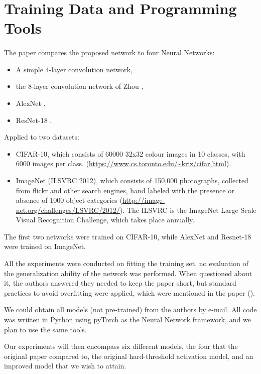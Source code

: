 \section{Training Data and Programming Tools}
\paragraph{}
The paper compares the proposed network to four Neural Networks:

\begin{itemize}
\item A simple 4-layer convolution network,
\item the 8-layer convolution network of Zhou \cite{zhou2016dorefa},
\item AlexNet \cite{alexnet},
\item ResNet-18 \cite{resnet18}.
\end{itemize}

Applied to two datasets:

\begin{itemize}
\item CIFAR-10, which consists of 60000 32x32 colour images in 10 classes, with 6000 images per class. (\url{https://www.cs.toronto.edu/~kriz/cifar.html}).
\item ImageNet (ILSVRC 2012), which consists of 150,000 photographs, collected from flickr and other search engines, hand labeled with the presence or absence of 1000 object categories (\url{http://image-net.org/challenges/LSVRC/2012/}). The ILSVRC is the ImageNet Large Scale Visual Recognition Challenge, which takes place annually.
\end{itemize}

The first two networks were trained on CIFAR-10, while AlexNet and Resnet-18 were trained on ImageNet. 

All the experiments were conducted on fitting the training set, no evaluation of the generalization ability of the network was performed. When questioned about it, the authors answered they needed to keep the paper short, but standard practices to avoid overfitting were applied, which were mentioned in the paper (\cite{FriesenReview}).

We could obtain all models (not pre-trained) from the authors by e-mail. All code was written in Python using pyTorch as the Neural Network framework, and we plan to use the same tools.

Our experiments will then encompass six different models, the four that the original paper compared to, the original hard-threshold activation model, and an improved model that we wish to attain.